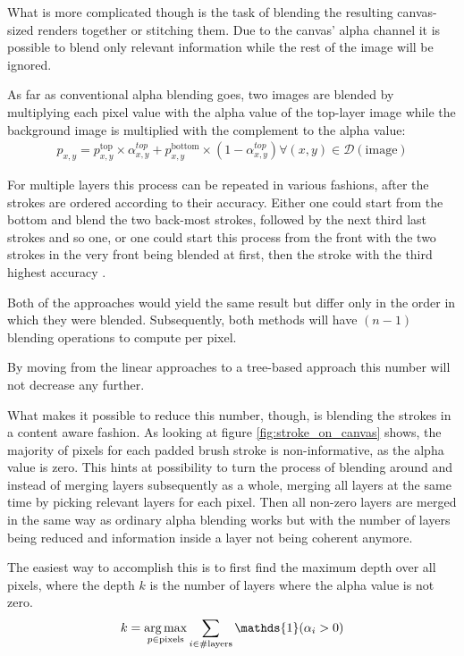 What is more complicated though is the task of blending the resulting canvas-sized
renders together or stitching them.
Due to the canvas' alpha channel it is possible to blend only relevant information
while the rest of the image will be ignored.

As far as conventional alpha blending goes, two images are blended by multiplying
each pixel value with the alpha value of the top-layer image while the background
image is multiplied with the complement to the alpha value:
\begin{align}
    p_{x,y} = p^{\text{top}}_{x, y} \times \alpha^{top}_{x, y}
    + p^{\text{bottom}}_{x, y} \times (1 - \alpha^{top}_{x, y})
    \forall (x, y) \in \mathcal{D}(\text{image})
\end{align}

For multiple layers this process can be repeated in various fashions, after the strokes
are ordered according to their accuracy.
Either one could start from the bottom and blend the two back-most strokes, followed
by the next third last strokes and so one, or one could start this process from
the front with the two strokes in the very front being blended at first, then the
stroke with the third highest accuracy \etc.

Both of the approaches would yield the same result but differ only in the order in
which they were blended.
Subsequently, both methods will have $(n-1)$ blending operations to compute per pixel.

By moving from the linear approaches to a tree-based approach this number will not
decrease any further.

What makes it possible to reduce this number, though, is blending the strokes in 
a content aware fashion.
As looking at figure \ref{fig:stroke_on_canvas} shows, the majority of pixels for
each padded brush stroke is non-informative, as the alpha value is zero.
This hints at possibility to turn the process of blending around and instead of merging
layers subsequently as a whole, merging all layers at the same time by picking relevant
layers for each pixel.
Then all non-zero layers are merged in the same way as ordinary alpha blending works
but with the number of layers being reduced and information inside a layer not being
coherent anymore.


The easiest way to accomplish this is to first find the maximum depth over all pixels,
where the depth $k$ is the number of layers where the alpha value is not zero.
\begin{align}
    k = \argmax_{p \in \text{pixels}} \sum_{i \in \# \text{layers}} \mathds{1}(\alpha_i > 0)
\end{align}

